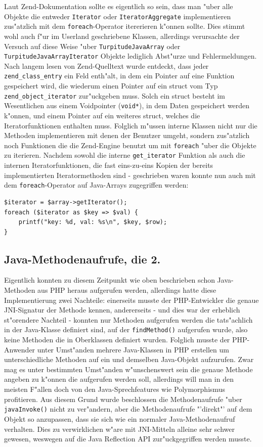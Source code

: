 Laut Zend-Dokumentation sollte es eigentlich so sein, dass man "uber alle Objekte die entweder \texttt{Iterator} oder \texttt{IteratorAggregate} implementieren zus"atzlich mit
dem \texttt{foreach}-Operator itererieren k"onnen sollte. Dies stimmt wohl auch f"ur im Userland geschriebene Klassen, allerdings verursachte der Versuch auf diese Weise
"uber \texttt{TurpitudeJavaArray} oder \texttt{TurpitudeJavaArrayIterator} Objekte lediglich Abst"urze und Fehlermeldungen. Nach langem lesen von Zend-Quelltext
wurde entdeckt, dass jeder \texttt{zend\_class\_entry} ein Feld enth"alt, in dem ein Pointer auf eine Funktion gespeichert wird, die wiederum einen Pointer auf ein struct vom Typ
\texttt{zend\_object\_iterator} zur"uckgeben muss. Solch ein struct besteht im Wesentlichen aus einem Voidpointer (\texttt{void*}), in dem Daten gespeichert werden k"onnen, und
einem Pointer auf ein weiteres struct, welches die Iteratorfunktionen enthalten muss. Folglich m"ussen interne Klassen nicht nur die Methoden implementieren mit denen der
Benutzer umgeht, sondern zus"atzlich noch Funktionen die die Zend-Engine benutzt um mit \texttt{foreach} "uber die Objekte zu iterieren. Nachdem sowohl die interne
\texttt{get\_iterator} Funktion als auch die internen Iteratorfunktionen, die fast eins-zu-eins Kopien der bereits implementierten Iteratormethoden sind - geschrieben waren
konnte nun auch mit dem \texttt{foreach}-Operator auf Java-Arrays zugegriffen werden:

\begin{lstlisting}[caption=Java-Array und foreach]
$iterator = $array->getIterator();
foreach ($iterator as $key => $val) {
    printf("key: %d, val: %s\n", $key, $row);
}
\end{lstlisting}

\subsection{Java-Methodenaufrufe, die 2.}
\label{sec:chap1:impl:12}

Eigentlich konnten zu diesem Zeitpunkt wie oben beschrieben schon Java-Methoden aus PHP heraus aufgerufen werden, allerdings hatte
diese Implementierung zwei Nachteile: einerseits musste der PHP-Entwickler die genaue JNI-Signatur der Methode kennen, andererseits -
und dies war der erheblich st"orendere Nachteil - konnten nur Methoden aufgerufen werden die tats"achlich in der Java-Klasse definiert
sind, auf der \texttt{findMethod()} aufgerufen wurde, also keine Methoden die in Oberklassen definiert wurden. Folglich musste der
PHP-Anwender unter Umst"anden mehrere Java-Klassen in PHP erstellen um unterschiedliche Methoden auf ein und demselben Java-Objekt
aufzurufen. Zwar mag es unter bestimmten Umst"anden w"unschenswert sein die genaue Methode angeben zu k"onnen die aufgerufen werden
soll, allerdings will man in den meisten F"allen doch von den Java-Sprechfeatures wie Polymorphismus profitieren. Aus diesem Grund
wurde beschlossen die Methodenaufrufe "uber \texttt{javaInvoke()} nicht zu ver"andern, aber die Methodenaufrufe "'direkt"' auf dem Objekt
so anzupassen, dass sie sich wie ein normaler Java-Methodenaufruf verhalten. Dies zu verwirklichen w"are mit JNI-Mitteln alleine
sehr schwer gewesen, weswegen auf die Java Reflection API zur"uckgegriffen werden musste.

